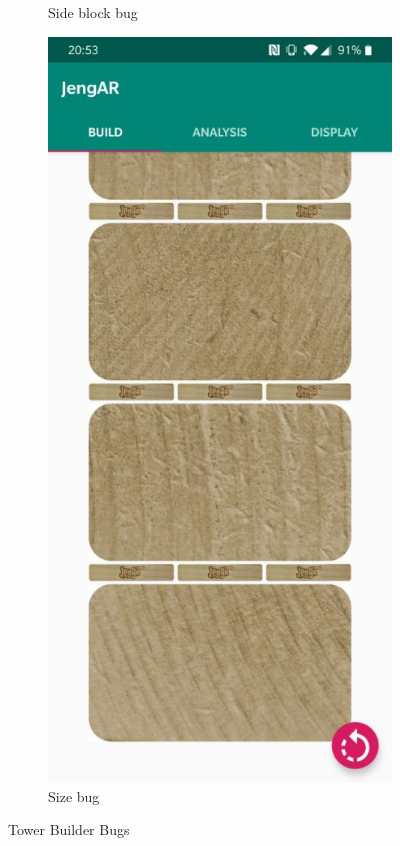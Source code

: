 \begin{figure}[ht]
\begin{subfigure}{0.3\textwidth}
\caption{Side block bug} \label{fig:uibug2}
\end{subfigure}
\hspace*{\fill}
\begin{subfigure}{0.3\textwidth}
\includegraphics[width=\linewidth]{images/evaluation/uibug3.jpg}
\caption{Size bug} \label{fig:uibug3}
\end{subfigure}
\hspace*{\fill}
\caption{Tower Builder Bugs}
\label{fig:uibugs}
\end{figure}

